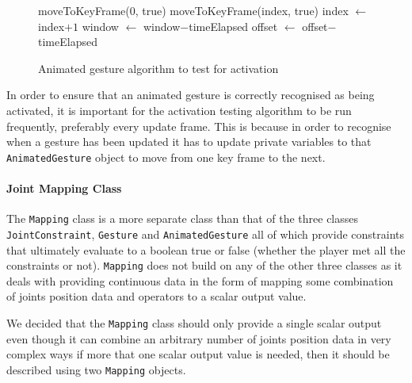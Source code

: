 \documentclass[a4paper,oneside]{memoir}
\begin{document}
					\begin{figure}[ht]
					\begin{center}
					\begin{algorithm}[H]
						\SetAlgoLined
						\LinesNumbered
						\setlength{\algomargin}{2em}

						 {
							 {
								 {
									moveToKeyFrame(0, true)\;
									\;
								}
								moveToKeyFrame(index, true)\;
								index $\gets$ index$+1$\;
							}
							window $\gets$ window$-$timeElapsed\;
						} {
							offset $\gets$ offset$-$timeElapsed\;
						}
						\;
						\caption{Animated gesture algorithm to test for activation}
						\label{alg:animated-gesture-activated}
					\end{algorithm}
					\end{center}
					\end{figure}
					
					In order to ensure that an animated gesture is correctly recognised as being activated, it is important for the activation testing algorithm to be run frequently, preferably every update frame.
					This is because in order to recognise when a gesture has been updated it has to update private variables to that \texttt{AnimatedGesture} object to move from one key frame to the next.

				\paragraph{Joint Mapping Class}

					The \texttt{Mapping} class is a more separate class than that of the three classes \texttt{JointConstraint}, \texttt{Gesture} and \texttt{AnimatedGesture} all of which provide constraints that ultimately evaluate to a boolean true or false (whether the player met all the constraints or not). \texttt{Mapping} does not build on any of the other three classes as it deals with providing continuous data in the form of mapping some combination of joints position data and operators to a scalar output value.

					We decided that the \texttt{Mapping} class should only provide a single scalar output even though it can combine an arbitrary number of joints position data in very complex ways if more that one scalar output value is needed, then it should be described using two \texttt{Mapping} objects.
\end{document}
